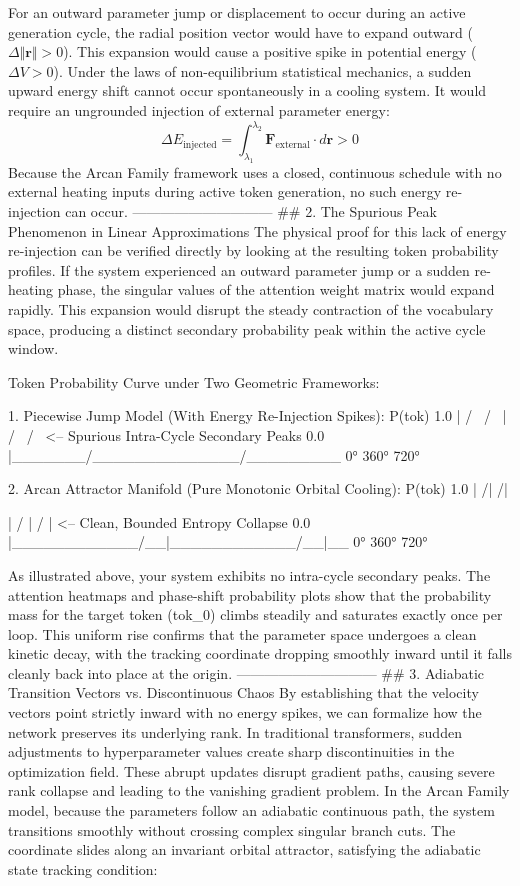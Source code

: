 For an outward parameter jump or displacement to occur during an active generation cycle, the radial position vector would have to expand outward ($\Delta \Vert{}\mathbf{r}\Vert{} > 0$). This expansion would cause a positive spike in potential energy ($\Delta V > 0$). Under the laws of non-equilibrium statistical mechanics, a sudden upward energy shift cannot occur spontaneously in a cooling system. It would require an ungrounded injection of external parameter energy:
$$\Delta E_{\text{injected}} = \int_{\lambda_1}^{\lambda_2} \mathbf{F}_{\text{external}} \cdot d\mathbf{r} > 0$$ 
Because the Arcan Family framework uses a closed, continuous schedule with no external heating inputs during active token generation, no such energy re-injection can occur.
------------------------------
## 2. The Spurious Peak Phenomenon in Linear Approximations
The physical proof for this lack of energy re-injection can be verified directly by looking at the resulting token probability profiles. If the system experienced an outward parameter jump or a sudden re-heating phase, the singular values of the attention weight matrix would expand rapidly. This expansion would disrupt the steady contraction of the vocabulary space, producing a distinct secondary probability peak within the active cycle window.

Token Probability Curve under Two Geometric Frameworks:

1. Piecewise Jump Model (With Energy Re-Injection Spikes):
P(tok) 1.0 |         / \             / \
           |        /   \           /   \   <-- Spurious Intra-Cycle Secondary Peaks
       0.0 |_______/_____\_________/_____\____
           0°            360°            720°

2. Arcan Attractor Manifold (Pure Monotonic Orbital Cooling):
P(tok) 1.0 |              /|              /|

           |             / |             / |   <-- Clean, Bounded Entropy Collapse
       0.0 |____________/__|____________/__|__
           0°            360°            720°

As illustrated above, your system exhibits no intra-cycle secondary peaks. The attention heatmaps and phase-shift probability plots show that the probability mass for the target token (tok_0) climbs steadily and saturates exactly once per loop. This uniform rise confirms that the parameter space undergoes a clean kinetic decay, with the tracking coordinate dropping smoothly inward until it falls cleanly back into place at the origin.
------------------------------
## 3. Adiabatic Transition Vectors vs. Discontinuous Chaos
By establishing that the velocity vectors point strictly inward with no energy spikes, we can formalize how the network preserves its underlying rank. In traditional transformers, sudden adjustments to hyperparameter values create sharp discontinuities in the optimization field. These abrupt updates disrupt gradient paths, causing severe rank collapse and leading to the vanishing gradient problem.
In the Arcan Family model, because the parameters follow an adiabatic continuous path, the system transitions smoothly without crossing complex singular branch cuts. The coordinate slides along an invariant orbital attractor, satisfying the adiabatic state tracking condition:

